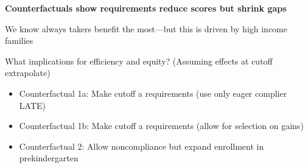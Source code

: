 \documentclass[t,aspectratio=169,11pt,presentation]{beamer}
\newenvironment{wideitemize}{\itemize\addtolength{\itemsep}{14pt}}{\enditemize}
\begin{document}
\begin{frame}{\textbf{Counterfactuals show requirements reduce scores but shrink gaps}}
\begin{wideitemize}
    \item We know always takers benefit the most---but this is driven by high income families
    
    \item<2-> What implications for efficiency and equity? (Assuming effects at cutoff extrapolate) 
    \begin{itemize}
        \item Counterfactual 1a: Make cutoff a requirements (use only eager complier LATE)
        \item Counterfactual 1b: Make cutoff a requirements (allow for selection on gains)
        \item Counterfactual 2: Allow noncompliance but expand enrollment in prekindergarten
        
    \end{itemize}


\end{wideitemize}
    
\end{frame}
\end{document}

